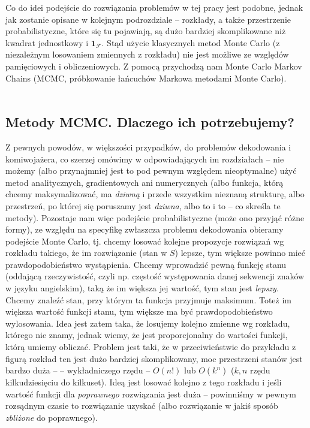 \documentclass[a4paper]{article}
\theoremstyle{defn}
\theoremstyle{theorem}
\theoremstyle{lemma}
\theoremstyle{cor}
\theoremstyle{fact}
\begin{document}
Co do idei podejście do rozwiązania problemów w tej pracy jest podobne, jednak jak zostanie opisane w kolejnym podrozdziale – rozkłady, a także przestrzenie probabilistyczne, które się tu pojawiają, są dużo bardziej skomplikowane niż kwadrat jednostkowy i $\mathbf{1}_{\mathcal{F}}$. Stąd użycie klasycznych metod Monte Carlo (z niezależnym losowaniem zmiennych z rozkładu) nie jest możliwe ze względów pamięciowych i obliczeniowych. Z pomocą przychodzą nam Monte Carlo Markov Chains (MCMC, próbkowanie łańcuchów Markowa metodami Monte Carlo).
\\\\
\subsection{Metody MCMC. Dlaczego ich potrzebujemy?}
Z pewnych powodów, w większości przypadków, do problemów dekodowania i komiwojażera, co szerzej omówimy w odpowiadających im rozdziałach – nie możemy (albo przynajmniej jest to pod pewnym względem nieoptymalne) użyć metod analitycznych, gradientowych ani numerycznych (albo funkcja, którą chcemy maksymalizować, ma \textit{dziwną} i przede wszystkim nieznaną strukturę, albo przestrzeń, po której się poruszamy jest \textit{dziwna}, albo to i to – co skreśla te metody). Pozostaje nam więc podejście probabilistyczne (może ono przyjąć różne formy), ze względu na specyfikę zwłaszcza problemu dekodowania obieramy podejście Monte Carlo, tj. chcemy losować kolejne propozycje rozwiązań wg rozkładu takiego, że im rozwiązanie (stan w $S$) lepsze, tym większe powinno mieć prawdopodobieństwo wystąpienia.
Chcemy wprowadzić pewną funkcję stanu (oddającą rzeczywistość, czyli np. częstość występowania danej sekwencji znaków w języku angielskim), taką że im większa jej wartość, tym stan jest \textit{lepszy}. Chcemy znaleźć stan, przy którym ta funkcja przyjmuje maksimum. Toteż im większa wartość funkcji stanu, tym większe ma być prawdopodobieństwo wylosowania. Idea jest zatem taka, że losujemy kolejno zmienne wg rozkładu, którego nie znamy, jednak wiemy, że jest proporcjonalny do wartości funkcji, którą umiemy obliczać. Problem jest taki, że w przeciwieństwie do przykładu z figurą rozkład ten jest dużo bardziej skomplikowany, moc przestrzeni stanów jest bardzo duża – – wykładniczego rzędu – $O(n!)$ lub $O(k^n)$ ($k, n$ rzędu kilkudziesięciu do kilkuset). Ideą jest losować kolejno z tego rozkładu i jeśli wartość funkcji dla \textit{poprawnego} rozwiązania jest duża – powinniśmy w pewnym rozsądnym czasie to rozwiązanie uzyskać (albo rozwiązanie w jakiś sposób \textit{zbliżone} do poprawnego). 
\end{document}
